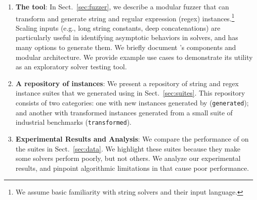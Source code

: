 \begin{enumerate}
    \item \textbf{The \fuzzer{} tool}:
        In Sect.~\ref{sec:fuzzer}, we describe a modular fuzzer that can
        transform and generate \smtfull{} string and regular
        expression (regex) instances.\footnote{We assume basic
        familiarity with string solvers and their input
        language.} Scaling inputs (e.g., long string constants,
        deep concatenations) are particularly useful in identifying asymptotic
        behaviors in solvers, and \fuzzer{} has many options to generate them.
        We briefly document \fuzzer{}'s components and modular architecture.
        We provide example use cases to demonstrate its utility as an
        exploratory solver testing tool.

    \item \textbf{A repository of \smtfull{} instances}:
        We present a repository of \smtfull{} string and regex instance suites
        that we generated using \fuzzer{} in Sect.~\ref{sec:suites}. This
        repository consists of two categories: one with new
        instances generated by \fuzzer{} (\texttt{generated}); and another with
        transformed instances generated from a small suite of industrial
        benchmarks (\texttt{transformed}).

    \item \textbf{Experimental Results and Analysis}:
        We compare the performance of \theSolvers{} on the
        \fuzzer{} suites \theSuites{} in Sect.~\ref{sec:data}. We
        highlight these suites because they make some solvers perform poorly,
        but not others. We analyze our
        experimental results, and pinpoint algorithmic limitations
        in \us{} that cause poor performance.
\end{enumerate}
